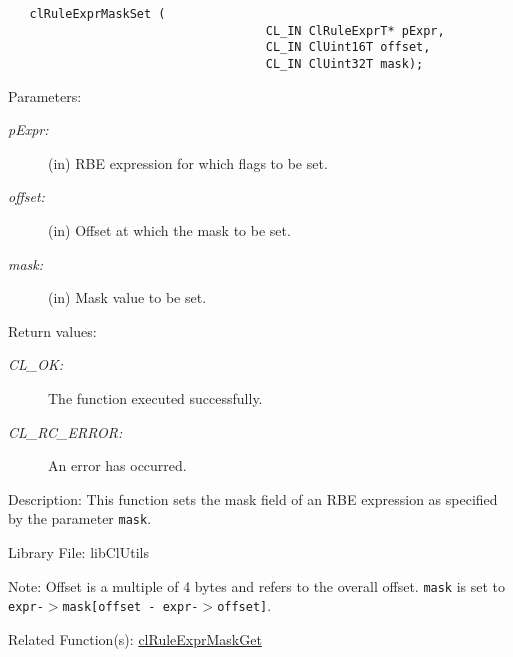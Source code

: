 \begin{flushleft}
\begin{Desc}
\footnotesize\begin{verbatim}   clRuleExprMaskSet (
                              		CL_IN ClRuleExprT* pExpr,
                              		CL_IN ClUint16T offset,
                              		CL_IN ClUint32T mask);
\end{verbatim}
\normalsize
\end{Desc}
\begin{Desc}
\item[Parameters:]
\begin{description}
\item[{\em p\-Expr:}](in) RBE expression for which flags to be set. \item[{\em offset:}](in) Offset at which the mask to be set.
\item[{\em mask:}](in) Mask value to be set.\end{description}
\end{Desc}
\begin{Desc}
\item[Return values:]
\begin{description}
\item[{\em CL\_\-OK:}]The function executed successfully. \item[{\em CL\_\-RC\_\-ERROR:}]An error has occurred.\end{description}
\end{Desc}
\begin{Desc}
\item[Description:]This function sets the mask field of an RBE expression as specified by the parameter {\tt{mask}}.\end{Desc}
\begin{Desc}
\item[Library File:]lib\-Cl\-Utils\end{Desc}
\begin{Desc}
\item[Note:]Offset is a multiple of 4 bytes and refers to the overall offset. {\tt{mask}} is set to {\tt{expr-$>$mask\mbox{[}offset - expr-$>$offset\mbox{]}}}.\end{Desc}
\begin{Desc}
\item[Related Function(s):]\hyperlink{group__group41}{cl\-Rule\-Expr\-Mask\-Get} \end{Desc}
\newpage


\end{flushleft}
